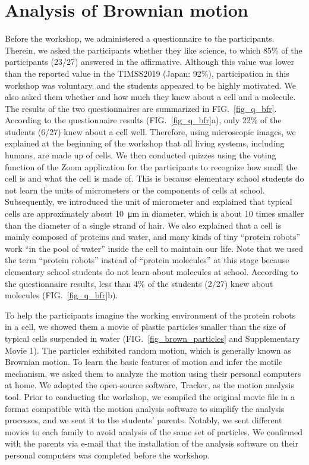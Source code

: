 \documentclass[10pt, aps, prb, preprint, longbibliography, superscriptaddress]{revtex4-2}
\newcommand{\figref}[1]{FIG.~\ref{#1}}
\begin{document}
\section{Analysis of Brownian motion}
Before the workshop, we administered a questionnaire to the participants.
Therein, we asked the participants whether they like science,
to which 85\% of the participants (23/27) answered in the affirmative.
Although this value was lower than the reported value in the TIMSS2019 (Japan: 92\%),\cite{timss}
participation in this workshop was voluntary, and the students appeared to be highly motivated.
We also asked them whether and how much they knew about a cell and a molecule.
The results of the two questionnaires are summarized in \figref{fig_q_bfr}.
According to the questionnaire results (\figref{fig_q_bfr}a), only 22\% of the students (6/27) knew about a cell well.
Therefore, using microscopic images, we explained at the beginning of the workshop that all living systems,
including humans, are made up of cells.
We then conducted quizzes using the voting function of the Zoom application
for the participants to recognize how small the cell is and what the cell is made of.
This is because elementary school students do not learn the units of micrometers
or the components of cells at school.
Subsequently, we introduced the unit of micrometer
and explained that typical cells are approximately about \SI{10}{\micro m} in diameter,
which is about 10 times smaller than the diameter of a single strand of hair.
We also explained that a cell is mainly composed of proteins and water,
and many kinds of tiny ``protein robots'' work ``in the pool of water'' inside the cell to maintain our life.
Note that we used the term ``protein robots'' instead of ``protein molecules'' at this stage
because elementary school students do not learn about molecules at school.
According to the questionnaire results, less than 4\% of the students (2/27) knew about molecules
(\figref{fig_q_bfr}b).

To help the participants imagine the working environment of the protein robots in a cell,
we showed them a movie of plastic particles smaller than
the size of typical cells suspended in water (\figref{fig_brown_particles} and Supplementary Movie 1).
The particles exhibited random motion, which is generally known as Brownian motion.\cite{howard_random}
To learn the basic features of motion and infer the motile mechanism,
we asked them to analyze the motion using their personal computers at home.
We adopted the open-source software, Tracker,
as the motion analysis tool.\cite{tracker, douglas_2011}
Prior to conducting the workshop,
we compiled the original movie file in a format compatible
with the motion analysis software to simplify the analysis processes,
and we sent it to the students' parents.
Notably, we sent different movies to each family to avoid analysis of the same set of particles.
We confirmed with the parents via e-mail that the installation of the analysis software
on their personal computers was completed before the workshop.
\end{document}
